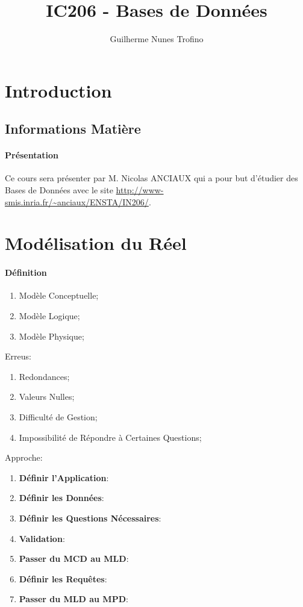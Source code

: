 \documentclass{article}
\title{IC206 - Bases de Données}
\author{Guilherme Nunes Trofino}
\begin{document}
\maketitle

\newpage\tableofcontents

\section{Introduction}

% 


\subsection{Informations Matière}
\paragraph{Présentation}Ce cours sera présenter par M. Nicolas ANCIAUX qui a pour but d'étudier des Bases de Données avec le site \url{http://www-smis.inria.fr/~anciaux/ENSTA/IN206/}.

\section{Modélisation du Réel}
\paragraph{Définition}
\begin{enumerate}[noitemsep]
    \item Modèle Conceptuelle;
    \item Modèle Logique;
    \item Modèle Physique;
\end{enumerate}
Erreus:
\begin{enumerate}[noitemsep]
    \item Redondances;
    \item Valeurs Nulles;
    \item Difficulté de Gestion;
    \item Impossibilité de Répondre à Certaines Questions;
\end{enumerate}
Approche:
\begin{enumerate}
    \item \textbf{Définir l'Application}:
    \item \textbf{Définir les Données}:
    \item \textbf{Définir les Questions Nécessaires}:
    \item \textbf{Validation}:
    \item \textbf{Passer du MCD au MLD}:
    \item \textbf{Définir les Requêtes}:
    \item \textbf{Passer du MLD au MPD}:
\end{enumerate}
\end{document}

